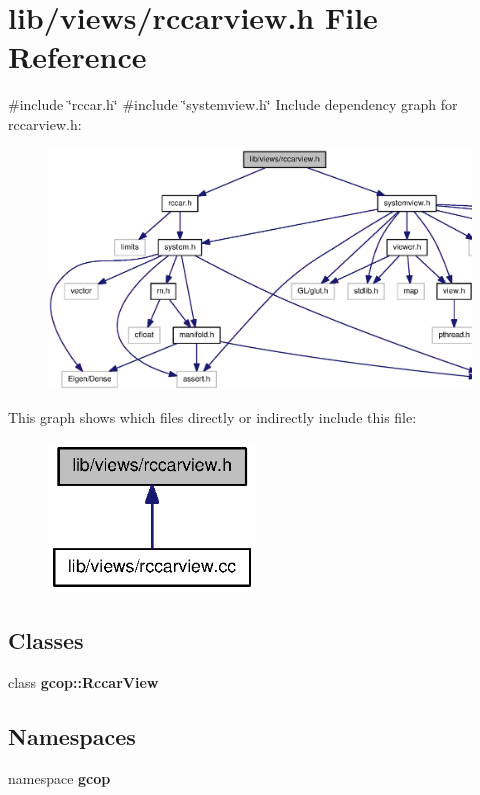 \section{lib/views/rccarview.h \-File \-Reference}
\label{rccarview_8h}
{\ttfamily \#include \char`\"{}rccar.\-h\char`\"{}}\*
{\ttfamily \#include \char`\"{}systemview.\-h\char`\"{}}\*
\-Include dependency graph for rccarview.\-h\-:\nopagebreak
\begin{figure}[H]
\begin{center}
\leavevmode
\includegraphics[width=350pt]{rccarview_8h__incl}
\end{center}
\end{figure}
\-This graph shows which files directly or indirectly include this file\-:\nopagebreak
\begin{figure}[H]
\begin{center}
\leavevmode
\includegraphics[width=156pt]{rccarview_8h__dep__incl}
\end{center}
\end{figure}
\subsection*{\-Classes}
\begin{DoxyCompactItemize}
\item 
class {\bf gcop\-::\-Rccar\-View}
\end{DoxyCompactItemize}
\subsection*{\-Namespaces}
\begin{DoxyCompactItemize}
\item 
namespace {\bf gcop}
\end{DoxyCompactItemize}
